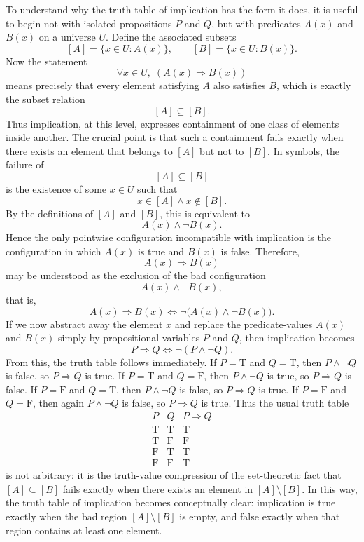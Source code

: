 \documentclass{article}
\begin{document}
	To understand why the truth table of implication has the form it does, it is useful to begin not with isolated propositions \(P\) and \(Q\), but with predicates \(A(x)\) and \(B(x)\) on a universe \(U\). Define the associated subsets
	\[
	[A]=\{x\in U:A(x)\},
	\qquad
	[B]=\{x\in U:B(x)\}.
	\]
	Now the statement
	\[
	\forall x\in U,\; (A(x)\Rightarrow B(x))
	\]
	means precisely that every element satisfying \(A\) also satisfies \(B\), which is exactly the subset relation
	\[
	[A]\subseteq[B].
	\]
	Thus implication, at this level, expresses containment of one class of elements inside another. The crucial point is that such a containment fails exactly when there exists an element that belongs to \([A]\) but not to \([B]\). In symbols, the failure of
	\[
	[A]\subseteq[B]
	\]
	is the existence of some \(x\in U\) such that
	\[
	x\in[A]\land x\notin[B].
	\]
	By the definitions of \([A]\) and \([B]\), this is equivalent to
	\[
	A(x)\land \neg B(x).
	\]
	Hence the only pointwise configuration incompatible with implication is the configuration in which \(A(x)\) is true and \(B(x)\) is false. Therefore,
	\[
	A(x)\Rightarrow B(x)
	\]
	may be understood as the exclusion of the bad configuration
	\[
	A(x)\land \neg B(x),
	\]
	that is,
	\[
	A(x)\Rightarrow B(x)\iff \neg\bigl(A(x)\land \neg B(x)\bigr).
	\]
	If we now abstract away the element \(x\) and replace the predicate-values \(A(x)\) and \(B(x)\) simply by propositional variables \(P\) and \(Q\), then implication becomes
	\[
	P\Rightarrow Q\iff \neg(P\land \neg Q).
	\]
	From this, the truth table follows immediately. If \(P=\mathrm{T}\) and \(Q=\mathrm{T}\), then \(P\land \neg Q\) is false, so \(P\Rightarrow Q\) is true. If \(P=\mathrm{T}\) and \(Q=\mathrm{F}\), then \(P\land \neg Q\) is true, so \(P\Rightarrow Q\) is false. If \(P=\mathrm{F}\) and \(Q=\mathrm{T}\), then \(P\land \neg Q\) is false, so \(P\Rightarrow Q\) is true. If \(P=\mathrm{F}\) and \(Q=\mathrm{F}\), then again \(P\land \neg Q\) is false, so \(P\Rightarrow Q\) is true. Thus the usual truth table
	\[
	\begin{array}{c|c|c}
		P & Q & P\Rightarrow Q\\
		\hline
		\mathrm{T} & \mathrm{T} & \mathrm{T}\\
		\mathrm{T} & \mathrm{F} & \mathrm{F}\\
		\mathrm{F} & \mathrm{T} & \mathrm{T}\\
		\mathrm{F} & \mathrm{F} & \mathrm{T}
	\end{array}
	\]
	is not arbitrary: it is the truth-value compression of the set-theoretic fact that \([A]\subseteq[B]\) fails exactly when there exists an element in \([A]\setminus[B]\). In this way, the truth table of implication becomes conceptually clear: implication is true exactly when the bad region \([A]\setminus[B]\) is empty, and false exactly when that region contains at least one element.
	
\end{document}
